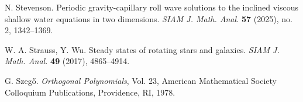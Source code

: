 \documentclass[11pt,reqno]{amsart}
\numberwithin{equation}{section}
\begin{document}
\begin{thebibliography}{}
  N. Stevenson. Periodic gravity-capillary roll wave solutions to the inclined viscous shallow water equations in two dimensions. \emph{SIAM J. Math. Anal.} \textbf{57} (2025), no. 2, 1342--1369.
 
  W. A. Strauss, Y. Wu.  Steady states of rotating stars and galaxies.
\emph{SIAM J. Math. Anal.} \textbf{49} (2017), 4865--4914.
 
  G. Szeg\H{o}. \emph{Orthogonal Polynomials}, Vol. 23, American Mathematical Society Colloquium Publications, Providence, RI, 1978.
 
 
\end{thebibliography}

 
  
\end{document}
